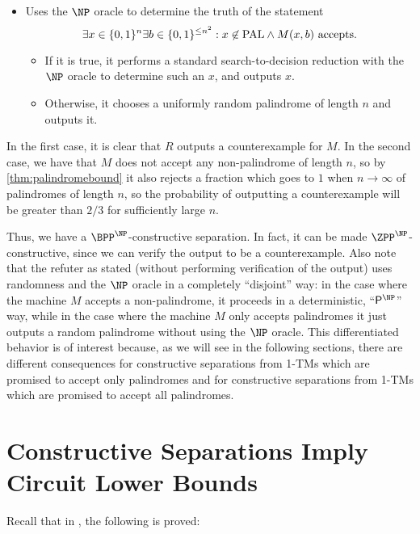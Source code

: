 \begin{itemize}
	\item Uses the $\NP$ oracle to determine the truth of the statement 
	$$\exists x \in \{0, 1\}^n \exists b \in \{0, 1\}^{\leq n^2} : x \not\in \mathrm{PAL} \wedge M(x, b) \text{ accepts}.$$ 
	\begin{itemize}
	\item If it is true, it performs a standard search-to-decision 
	reduction with the $\NP$ oracle to determine such an $x$, and outputs $x$.
	\item Otherwise, it chooses a uniformly random palindrome of length $n$ and outputs it. 
	\end{itemize}
\end{itemize}

In the first case, it is clear that $R$ outputs a counterexample for $M$. 
In the second case, we have that $M$ does not accept any non-palindrome of length $n$, so
by \cref{thm:palindromebound} it also rejects a fraction which goes to $1$ when $n \rightarrow \infty$
of palindromes of length $n$, 
so the probability of outputting a counterexample will be greater than $2/3$ for sufficiently large $n$.

Thus, we have a $\BPP^\NP$-constructive separation. In fact, it can be made $\ZPP^\NP$-constructive,
since we can verify the output to be a counterexample.
Also note that the refuter as stated (without performing verification of the output)
uses randomness and the $\NP$ oracle in a completely ``disjoint'' way:
in the case where the machine $M$ accepts a non-palindrome, it proceeds in a deterministic,
``$\PTIME^\NP$'' way, while in the case where the machine $M$ only accepts palindromes
it just outputs a random palindrome without using the $\NP$ oracle.
This differentiated behavior is of interest because, as we will see in the following sections,
there are different consequences for constructive separations from 1-TMs which are promised
to accept only palindromes and for constructive
separations from 1-TMs which are promised to accept all palindromes. 



\section{Constructive Separations Imply Circuit Lower Bounds}

Recall that in \cite{ConstructiveSeparations}, the following is proved:

